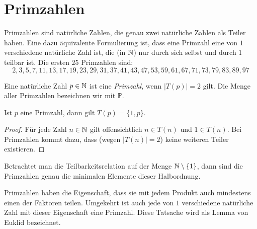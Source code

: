 \section{Primzahlen}

Primzahlen sind natürliche Zahlen, die genau zwei natürliche Zahlen als Teiler haben. Eine dazu äquivalente Formulierung ist, dass eine Primzahl eine von $1$ verschiedene natürliche Zahl ist, die (in $\mathbb{N}$) nur durch sich selbst und durch $1$ teilbar ist. Die ersten $25$ Primzahlen sind:
\[
2, 3, 5, 7, 11, 13, 17, 19, 23, 29, 31, 37, 41, 43, 47, 53, 59, 61, 67, 71, 73, 79, 83, 89, 97
\]

\begin{df}
Eine natürliche Zahl $p\in\mathbb{N}$ ist eine \textit{Primzahl}, wenn $|T(p)|=2$ gilt. Die Menge aller Primzahlen bezeichnen wir mit $\mathbb{P}$.
\end{df}

\begin{rk}
Ist $p$ eine Primzahl, dann gilt $T(p)=\{1,p\}$.
\end{rk}
\begin{proof}
Für jede Zahl $n\in\mathbb{N}$ gilt offensichtlich $n\in T(n)$ und $1\in T(n)$. Bei Primzahlen kommt dazu, dass (wegen $|T(n)|=2$) keine weiteren Teiler existieren.
\end{proof}

\begin{rk}
Betrachtet man die Teilbarkeitsrelation auf der Menge $\mathbb{N}\setminus \{1\}$, dann sind die Primzahlen genau die minimalen Elemente dieser Halbordnung.
\end{rk}

Primzahlen haben die Eigenschaft, dass sie mit jedem Produkt auch mindestens einen der Faktoren teilen. Umgekehrt ist auch jede von $1$ verschiedene natürliche Zahl mit dieser Eigenschaft eine Primzahl. Diese Tatsache wird als Lemma von Euklid bezeichnet.

